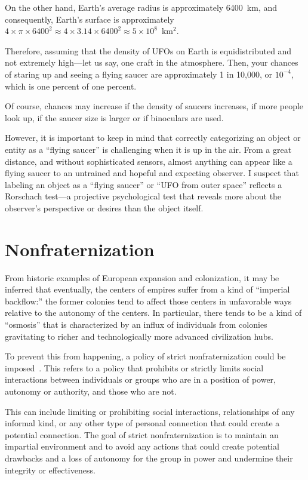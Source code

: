 On the other hand, Earth's average radius is approximately 6400~km, and consequently, Earth's surface is approximately $4\times \pi \times 6400^2 \approx 4\times 3.14 \times 6400^2 \approx 5 \times 10^8$~km$^2$.

Therefore, assuming that the density of UFOs on Earth is equidistributed and not extremely high---let us say, one craft in the atmosphere.
Then,
your chances of staring up and seeing a flying saucer are approximately 1 in 10,000, or $10^{-4}$,
which is one percent of one percent.

Of course, chances may increase if the density of saucers increases,
if more people look up,
if the saucer size is larger or if binoculars are used.

However, it is important to keep in mind that correctly categorizing an object or entity as a ``flying saucer''
is challenging when it is up in the air. From a great distance, and without sophisticated sensors,
almost anything can appear like a flying saucer to an untrained and hopeful and expecting observer.
I suspect that labeling an object as a ``flying saucer'' or ``UFO from outer space'' reflects a Rorschach test---a
projective psychological test that reveals more about the observer's perspective or desires than the object itself.





\section{Nonfraternization}
\label{2023-UFO-part-Speculation-among-hypercivilization-zoo-hypothesis-nfp}

From historic examples of European expansion and colonization, it may be inferred that eventually, the centers of empires suffer from a kind of ``imperial backflow:'' the former colonies tend to affect those centers in unfavorable ways relative to the autonomy of the centers. In particular, there tends to be a kind of ``osmosis'' that is characterized by an influx of individuals from colonies gravitating to richer and technologically more advanced civilization hubs.

To prevent this from happening, a policy of strict nonfraternization could be imposed~\cite{GulfOfSilencey2020}.
This refers to a policy that prohibits or strictly limits social interactions between individuals or groups who are in a position of power,
 autonomy or authority, and those who are not.

This can include limiting or prohibiting social interactions, relationships of any informal kind,
or any other type of personal connection that could create a potential connection. The goal of strict nonfraternization is to maintain an impartial environment and to avoid any actions that could create potential drawbacks and a loss of autonomy for the group in power and undermine their integrity or effectiveness.

